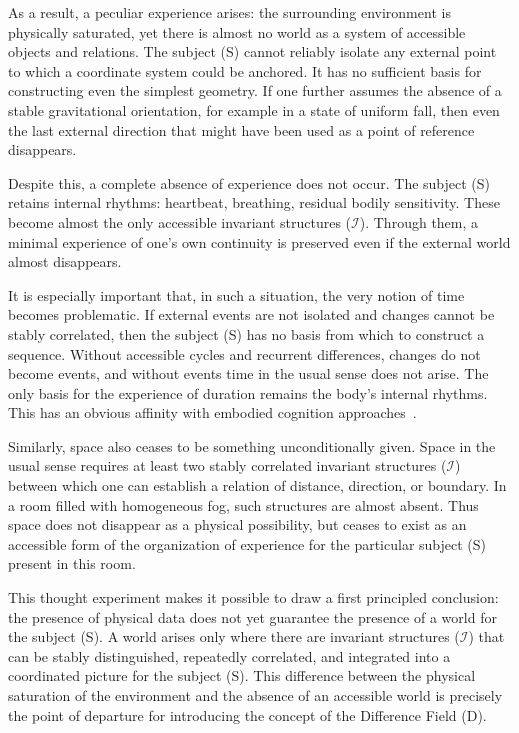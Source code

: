 \documentclass[aps,prd,onecolumn,nofootinbib,superscriptaddress]{revtex4-2}
\begin{document}
As a result, a peculiar experience arises: the surrounding environment is physically saturated, yet there is almost no world as a system of accessible objects and relations. The subject (S) cannot reliably isolate any external point to which a coordinate system could be anchored. It has no sufficient basis for constructing even the simplest geometry. If one further assumes the absence of a stable gravitational orientation, for example in a state of uniform fall, then even the last external direction that might have been used as a point of reference disappears.

Despite this, a complete absence of experience does not occur. The subject (S) retains internal rhythms: heartbeat, breathing, residual bodily sensitivity. These become almost the only accessible invariant structures ($\mathcal{I}$). Through them, a minimal experience of one’s own continuity is preserved even if the external world almost disappears.

It is especially important that, in such a situation, the very notion of time becomes problematic. If external events are not isolated and changes cannot be stably correlated, then the subject (S) has no basis from which to construct a sequence. Without accessible cycles and recurrent differences, changes do not become events, and without events time in the usual sense does not arise. The only basis for the experience of duration remains the body’s internal rhythms. This has an obvious affinity with embodied cognition approaches~\cite{VarelaThompsonRosch1991}.

Similarly, space also ceases to be something unconditionally given. Space in the usual sense requires at least two stably correlated invariant structures ($\mathcal{I}$) between which one can establish a relation of distance, direction, or boundary. In a room filled with homogeneous fog, such structures are almost absent. Thus space does not disappear as a physical possibility, but ceases to exist as an accessible form of the organization of experience for the particular subject (S) present in this room.

This thought experiment makes it possible to draw a first principled conclusion: the presence of physical data does not yet guarantee the presence of a world for the subject (S). A world arises only where there are invariant structures ($\mathcal{I}$) that can be stably distinguished, repeatedly correlated, and integrated into a coordinated picture for the subject (S). This difference between the physical saturation of the environment and the absence of an accessible world is precisely the point of departure for introducing the concept of the Difference Field (D).
\end{document}
